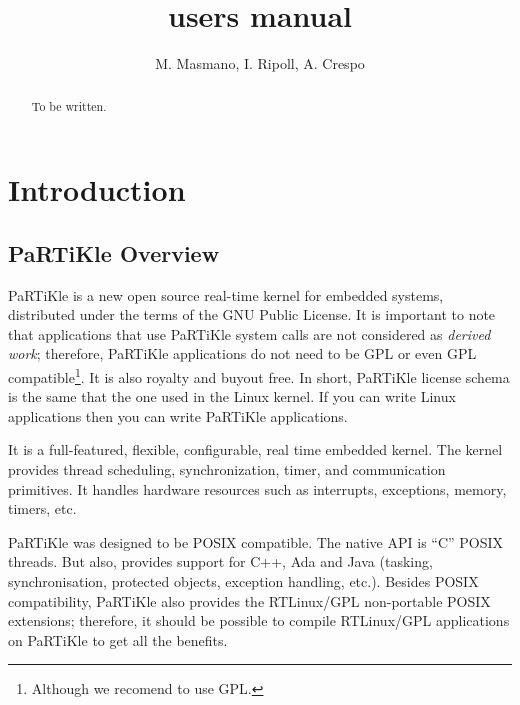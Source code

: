 \documentclass[a4paper,10pt,twoside]{report}
\title{\partikle{} users manual}
\author{M. Masmano, I. Ripoll, A. Crespo}
\newcommand{\partikle}[0]{PaRTiKle}
\newcommand{\xtratum}[0]{XtratuM}
\begin{document}
 
\maketitle

\begin{abstract}
To be written.
\end{abstract}
\chapter{Introduction}
\section{\partikle{} Overview}
\partikle{} is a new open source real-time kernel for embedded systems,
distributed under the terms of the GNU Public License. It is important
to note that applications that use \partikle{} system calls are not
considered as \textit{derived work}; therefore, \partikle{} applications
do not need to be GPL or even GPL compatible\footnote{Although we
  recomend to use GPL.}.  It is also royalty and buyout free. In
short, \partikle{} license schema is the same that the one used in the
Linux kernel. If you can write Linux applications then you can write
\partikle{} applications.

It is a full-featured, flexible, configurable, real time embedded
kernel. The kernel provides thread scheduling, synchronization, timer,
and communication primitives. It handles hardware resources such as
interrupts, exceptions, memory, timers, etc.
 

\partikle{} was designed to be POSIX compatible. The native API is ``C''
POSIX threads. But also, provides support for C++, Ada and Java
(tasking, synchronisation, protected objects, exception handling,
etc.).  Besides POSIX compatibility, \partikle{} also provides the
RTLinux/GPL non-portable POSIX extensions; therefore, it should be
possible to compile RTLinux/GPL applications on \partikle{} to get all
the benefits.
\end{document}
